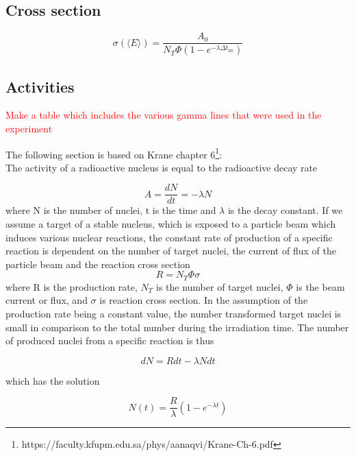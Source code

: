 \documentclass[a4paper,11pt,twoside]{book}
\begin{document}
\subsection{Cross section}
\begin{equation} \label{eq:CS_ch3}
    \sigma(\langle E \rangle) = \frac{A_0}{N_T \Phi (1-e^{-\lambda \Delta t_\text{irr}})}
\end{equation}


\subsection{Activities}
\textcolor{red}{Make a table which includes the various gamma lines that were used in the experiment}

The following section is based on Krane chapter 6\footnote{https://faculty.kfupm.edu.sa/phys/aanaqvi/Krane-Ch-6.pdf}: \\

\noindent 
The activity of a radioactive nucleus is equal to the radioactive decay rate 

\begin{equation}
    A = \frac{dN}{dt} = -\lambda N
\end{equation}
\noindent where N is the number of nuclei, t is the time and $\lambda$ is the decay constant. If we assume a target of a stable nucleus, which is exposed to a particle beam which induces various nuclear reactions, the constant rate of production of a specific reaction is dependent on the number of target nuclei, the current of flux of the particle beam and the reaction cross section 
\begin{equation} \label{eq:prod_rate}
    R = N_T \Phi \sigma
\end{equation}
\noindent 
where R is the production rate, $N_T$ is the number of target nuclei, $\Phi$ is the beam current or flux, and $\sigma$ is reaction cross section. In the assumption of the production rate being a constant value, the number transformed target nuclei is small in comparison to the total number during the irradiation time. The number of produced nuclei from a specific reaction is thus 

\begin{equation}
    dN = Rdt -\lambda N dt
\end{equation}

\noindent which has the solution 

\begin{equation}
    N(t) = \frac{R}{\lambda} (1-e^{-\lambda t})
\end{equation}
\end{document}
